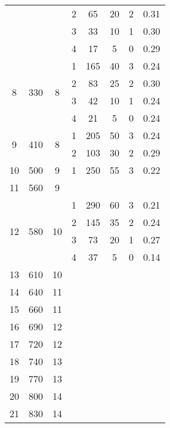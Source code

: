 \begin{longtable}[c]{|c|c|c|c|c|c|c|c|}
    & & & 2 & 65 & 20 & 2 & 0.31 \\\cline{4-8}
    & & & 3 & 33 & 10 & 1 & 0.30 \\\cline{4-8}
    & & & 4 & 17 & 5 & 0 & 0.29 \\\hline
    \multirow{4}{*}{8} & \multirow{4}{*}{330} & \multirow{4}{*}{8} & 1 & 165 & 40 & 3 & 0.24 \\\cline{4-8}
    & & & 2 & 83 & 25 & 2 & 0.30 \\\cline{4-8}
    & & & 3 & 42 & 10 & 1 & 0.24 \\\cline{4-8}
    & & & 4 & 21 & 5 & 0 & 0.24 \\\hline
    \multirow{2}{*}{9} & \multirow{2}{*}{410} & \multirow{2}{*}{8} & 1 & 205 & 50 & 3 & 0.24 \\\cline{4-8}
    & & & 2 & 103 & 30 & 2 & 0.29 \\\hline
    \multirow{1}{*}{10} & \multirow{1}{*}{500} & \multirow{1}{*}{9} & 1 & 250 & 55 & 3 & 0.22 \\\hline
    \multirow{1}{*}{11} & \multirow{1}{*}{560} & \multirow{1}{*}{9} & & & & & \\\hline
    \multirow{4}{*}{12} & \multirow{4}{*}{580} & \multirow{4}{*}{10} & 1 & 290 & 60 & 3 & 0.21 \\\cline{4-8}
    & & & 2 & 145 & 35 & 2 & 0.24 \\\cline{4-8}
    & & & 3 & 73 & 20 & 1 & 0.27 \\\cline{4-8}
    & & & 4 & 37 & 5 & 0 & 0.14 \\\hline
    \multirow{1}{*}{13} & \multirow{1}{*}{610} & \multirow{1}{*}{10} & & & & & \\\hline
    \multirow{1}{*}{14} & \multirow{1}{*}{640} & \multirow{1}{*}{11} & & & & & \\\hline
    \multirow{1}{*}{15} & \multirow{1}{*}{660} & \multirow{1}{*}{11} & & & & & \\\hline
    \multirow{1}{*}{16} & \multirow{1}{*}{690} & \multirow{1}{*}{12} & & & & & \\\hline
    \multirow{1}{*}{17} & \multirow{1}{*}{720} & \multirow{1}{*}{12} & & & & & \\\hline
    \multirow{1}{*}{18} & \multirow{1}{*}{740} & \multirow{1}{*}{13} & & & & & \\\hline
    \multirow{1}{*}{19} & \multirow{1}{*}{770} & \multirow{1}{*}{13} & & & & & \\\hline
    \multirow{1}{*}{20} & \multirow{1}{*}{800} & \multirow{1}{*}{14} & & & & & \\\hline
    \multirow{1}{*}{21} & \multirow{1}{*}{830} & \multirow{1}{*}{14} & & & & & \\\hline

\end{longtable}
